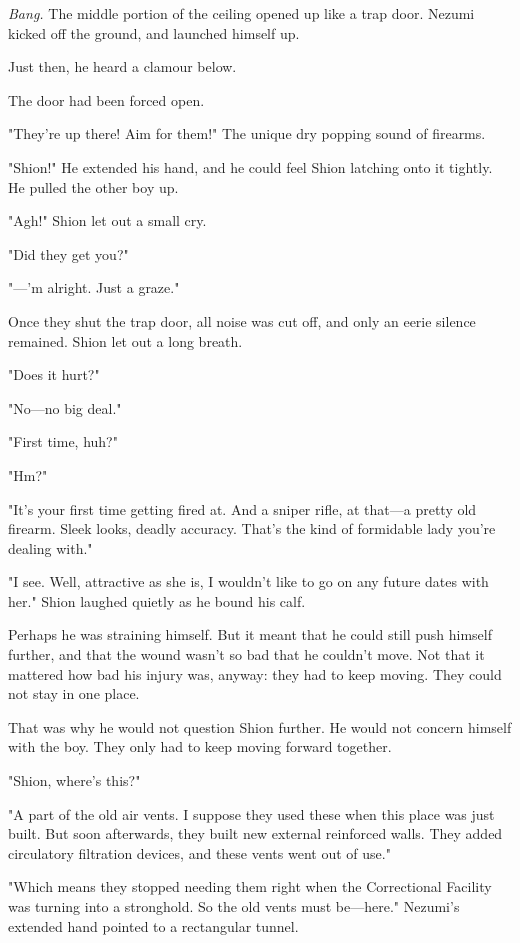 \emph{Bang.} The middle portion of the ceiling opened up like a trap door.
Nezumi kicked off the ground, and launched himself up.~

Just then, he heard a clamour below.

The door had been forced open.

"They're up there! Aim for them!" The unique dry popping sound of
firearms.

"Shion!" He extended his hand, and he could feel Shion latching onto it
tightly. He pulled the other boy up.

"Agh!" Shion let out a small cry.

"Did they get you?"

"---'m alright. Just a graze."

Once they shut the trap door, all noise was cut off, and only an eerie
silence remained. Shion let out a long breath.

"Does it hurt?"

"No---no big deal."

"First time, huh?"

"Hm?"

"It's your first time getting fired at. And a sniper rifle, at that---a
pretty old firearm. Sleek looks, deadly accuracy. That's the kind of
formidable lady you're dealing with."

"I see. Well, attractive as she is, I wouldn't like to go on any future
dates with her." Shion laughed quietly as he bound his calf.

Perhaps he was straining himself. But it meant that he could still push
himself further, and that the wound wasn't so bad that he couldn't move.
Not that it mattered how bad his injury was, anyway: they had to keep
moving. They could not stay in one place.

That was why he would not question Shion further. He would not concern
himself with the boy. They only had to keep moving forward together.

"Shion, where's this?"

"A part of the old air vents. I suppose they used these when this place
was just built. But soon afterwards, they built new external reinforced
walls. They added circulatory filtration devices, and these vents went
out of use."

"Which means they stopped needing them right when the Correctional
Facility was turning into a stronghold. So the old vents must be---here."
Nezumi's extended hand pointed to a rectangular tunnel.

